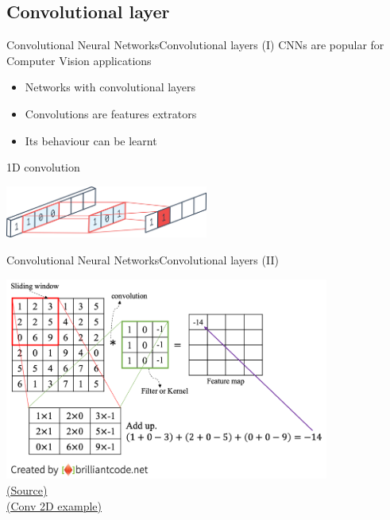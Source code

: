 \documentclass[10pt,compress]{beamer} %
\begin{document}
\subsection{Convolutional layer}
\begin{frame}{Convolutional Neural Networks}{Convolutional layers (I)}
    CNNs are popular for Computer Vision applications
	\begin{itemize}
		\item Networks with convolutional layers
        \item Convolutions are features extrators
        \item Its behaviour can be learnt
	\end{itemize}

    \bigskip 
	\centering 1D convolution \\
    \bigskip 

	\includegraphics[width=0.5\textwidth]{figs/1dconv.png}
\end{frame}

\begin{frame}{Convolutional Neural Networks}{Convolutional layers (II)}
    \centering

	\includegraphics[width=0.8\textwidth]{figs/2dconvolution.png}\\
	\scriptsize\href{https://www.brilliantcode.net/1584/convolutional-neural-networks-1-convolution-layer-stride-padding-kernel/}{(Source)}\\
    \bigskip
	\normalsize \href{https://miro.medium.com/max/500/1*GcI7G-JLAQiEoCON7xFbhg.gif}{(Conv 2D example)}
\end{frame}
\end{document}
